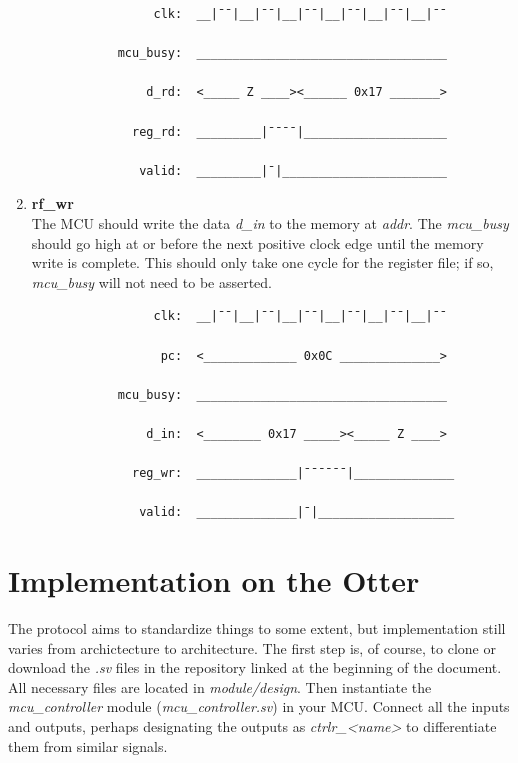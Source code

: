\documentclass[10pt,a4paper]{article}
\begin{document}
\begin{enumerate}
        \begin{verbatim}
                 clk:  __|¯¯|__|¯¯|__|¯¯|__|¯¯|__|¯¯|__|¯¯

            mcu_busy:  ___________________________________

                d_rd:  <_____ Z ____><______ 0x17 _______>

              reg_rd:  _________|¯¯¯¯|____________________

               valid:  _________|¯|_______________________
        \end{verbatim}

    \newpage

    \item\textbf{rf\_wr}\\
    The MCU should write the data \emph{d\_in} to the memory at \emph{addr}. The \emph{mcu\_busy}
    should go high at or before the next positive clock edge until the memory write is complete.
    This should only take one cycle for the register file; if so, \emph{mcu\_busy} will not need to
    be asserted.

        \begin{verbatim}
                 clk:  __|¯¯|__|¯¯|__|¯¯|__|¯¯|__|¯¯|__|¯¯

                  pc:  <_____________ 0x0C ______________>

            mcu_busy:  ___________________________________

                d_in:  <________ 0x17 _____><_____ Z ____>

              reg_wr:  ______________|¯¯¯¯¯¯|______________

               valid:  ______________|¯|___________________
        \end{verbatim}

\end{enumerate}

\section{Implementation on the Otter}
The protocol aims to standardize things to some extent, but implementation still varies from archictecture
to architecture. The first step is, of course, to clone or download the \emph{.sv} files in the
repository linked at the beginning of the document. All necessary files are located in
\emph{module/design}. Then instantiate the \emph{mcu\_controller} module (\emph{mcu\_controller.sv})
in your MCU. Connect all the inputs and outputs, perhaps designating the outputs as
\emph{ctrlr\_<name>} to differentiate them from similar signals.
\end{document}
